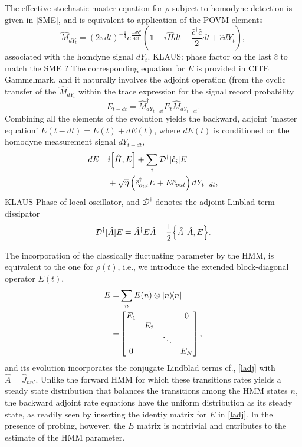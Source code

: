 \documentclass[aps,pra,twocolumn,groupedaddress,showpacs]{revtex4}
\begin{document}
The effective stochastic master equation for $\rho$ subject to homodyne detection is given in \eqref{SME}, and is equivalent to application of the POVM elements 
\begin{equation}
\hat M_{dY_{t}} = (2\pi dt)^{-\frac{1}{4}}e^{\frac{-dY_t^2}{4dt}}\left( \mathbb{1} -i\hat H dt - \frac{\hat c^\dag \hat c}{2}dt + \hat c dY_t\right),
\end{equation} 
associated with the homdyne signal $dY_t$.  KLAUS: phase factor on the last $\hat{c}$ to match the SME ?
The corresponding equation for $E$ is provided in CITE Gammelmark, and it naturally involves the adjoint operation (from the cyclic transfer of the $\hat{M}_{dY_t}$ within the trace expression for the signal record probability
\begin{equation}
E_{t-dt} = \hat M_{dY_{t-dt}}^\dag E_t \hat M_{dY_{t-dt}}.
\end{equation}
Combining all the elements of the evolution yields the backward, adjoint 'master equation'  $E(t-dt)=E(t) + dE(t)$, where $dE(t)$ is conditioned on the homodyne measurement signal $dY_{t-dt}$, 
\begin{align}
dE =& i\comm{\hat H}{E} + \sum_i \mathcal{D}^\dag[\hat c_i]E \nonumber\\
&+ \sqrt{\eta}\left( \hat c_{out}^\dag E + E\hat c_{out} \right)dY_{t-dt},
\end{align}
KLAUS Phase of local oscillator, 
and $\mathcal{D}^\dag$ denotes the adjoint Linblad term dissipator
\begin{equation} \label{ladj}
	\mathcal{D}^\dag[\hat A] E = \hat A^\dag E \hat A - \frac{1}{2} \acomm{\hat A^\dag \hat A}{E}.
\end{equation}


The incorporation of the classically fluctuating parameter by the HMM, is equivalent to the one for $\rho(t)$, i.e., we introduce the extended block-diagonal operator $E(t)$,
\begin{align} \label{blockE}
E =& \sum_n E(n) \otimes \dyad{n}{n}\nonumber \\
=& \begin{bmatrix}
E_1 & & & 0\\
& E_2 & & \\
& & \ddots & \\
0 & & & E_N
\end{bmatrix},
\end{align}
and its evolution incorporates the conjugate Lindblad terms cf., \eqref{ladj} with $\hat{A}=\hat{J}_{nn'}$. Unlike the forward HMM for which these transitions rates yields a steady state distribution that balances the transitions among the HMM states $n$, the backward adjoint rate equations have the uniform distribution as its steady state, as readily seen by inserting the identiy matrix for $E$ in \eqref{ladj}. In the presence of probing, however, the $E$ matrix is nontrivial and cntributes to the estimate of the HMM parameter.    
\end{document}

